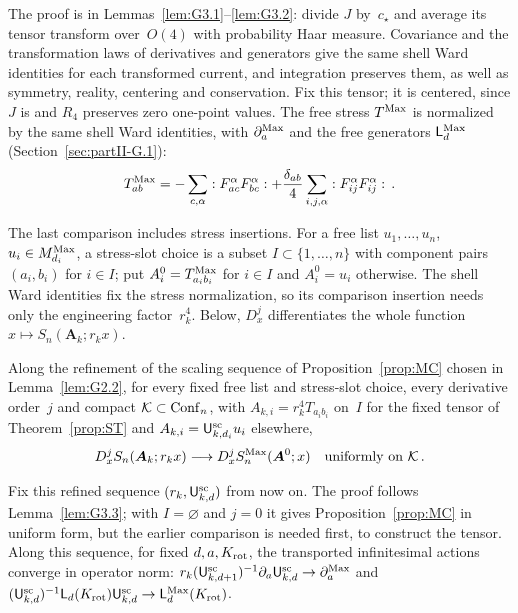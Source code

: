 The proof is in Lemmas~\ref{lem:G3.1}--\ref{lem:G3.2}: divide $J$ by~$c_\star$ and average its tensor transform over~$O(4)$ with probability Haar measure. Covariance and the transformation laws of derivatives and generators give the same shell Ward identities for each transformed current, and integration preserves them, as well as symmetry, reality, centering and conservation. Fix this tensor; it is centered, since $J$ is and $R_4$ preserves zero one-point values. The free stress $T^{\mathrm{Max}}$ is normalized by the same shell Ward identities, with $\partial_a^{\rm Max}$ and the free generators $\mathsf L_d^{\rm Max}$ (Section~\ref{sec:partII-G.1}):
\begin{equation*}
T^{\mathrm{Max}}_{ab}=-\sum_{c,\alpha}:F_{ac}^\alpha F_{bc}^\alpha:
+\frac{\delta_{ab}}4\sum_{i,j,\alpha}:F_{ij}^\alpha F_{ij}^\alpha:\,.
\end{equation*}

The last comparison includes stress insertions. For a free list $u_1,\ldots,u_n$, $u_i\in M_{d_i}^{\mathrm{Max}}$, a stress-slot choice is a subset $I\subset\{1,\ldots,n\}$ with component pairs $(a_i,b_i)$ for $i\in I$; put $A_i^0=T^{\mathrm{Max}}_{a_ib_i}$ for $i\in I$ and $A_i^0=u_i$ otherwise. The shell Ward identities fix the stress normalization, so its comparison insertion needs only the engineering factor~$r_k^4$. Below, $D_x^j$ differentiates the whole function $x\mapsto S_n(\boldsymbol A_k;r_kx)$.

\begin{proposition}\label{prop:SC}
Along the refinement of the scaling sequence of Proposition~\ref{prop:MC} chosen in Lemma~\ref{lem:G2.2}, for every fixed free list and stress-slot choice, every derivative order~$j$ and compact $\mathcal K\subset\mathrm{Conf}_{n}$, with $A_{k,i}=r_k^4T_{a_ib_i}$ on~$I$ for the fixed tensor of Theorem~\ref{prop:ST} and $A_{k,i}=\mathsf{U}_{k,d_i}^{\mathrm{sc}}u_i$ elsewhere,
\begin{equation*}
D_x^jS_n(\boldsymbol A_k;r_kx)\longrightarrow D_x^jS^{\mathrm{Max}}_n(\boldsymbol A^0;x)
\quad\text{uniformly on }\mathcal K\,.
\end{equation*}
\end{proposition}
Fix this refined sequence $(r_k,\mathsf{U}_{k,d}^{\mathrm{sc}})$ from now on. The proof follows Lemma~\ref{lem:G3.3}; with $I=\varnothing$ and $j=0$ it gives Proposition~\ref{prop:MC} in uniform form, but the earlier comparison is needed first, to construct the tensor. Along this sequence, for fixed $d,a,K_{\rm rot}$, the transported infinitesimal actions converge in operator norm: $r_k(\mathsf{U}_{k,d+1}^{\mathrm{sc}})^{-1}\partial_a\mathsf{U}_{k,d}^{\mathrm{sc}}\to\partial_a^{\rm Max}$ and $(\mathsf{U}_{k,d}^{\mathrm{sc}})^{-1}\mathsf L_d(K_{\rm rot})\mathsf{U}_{k,d}^{\mathrm{sc}}\to\mathsf L_d^{\rm Max}(K_{\rm rot})$.

